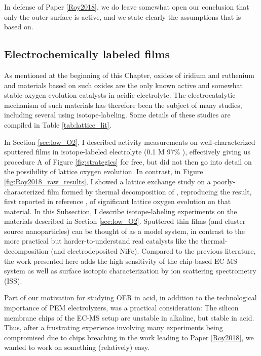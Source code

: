 In defense of Paper \ref{Roy2018}, we do leave somewhat open our conclusion that only the outer surface is active, and we state clearly the assumptions that is based on. 

\subsection{Electrochemically labeled  films} \label{subsec:Ru_exchange}

As mentioned at the beginning of this Chapter, oxides of iridium and ruthenium and materials based on such oxides are the only known active and somewhat stable oxygen evolution catalysts in acidic electrolyte\cite{Reier2017, Kibsgaard2019}. The electrocatalytic mechanism of such materials has therefore been the subject of many studies, including several using isotope-labeling\cite{Wohlfahrt-Mehrens1987, Fierro2007, Macounova2009, Stoerzinger2017, Grimaud2017}. Some details of these studies are compiled in Table \ref{tab:lattice_lit}.

In Section \ref{sec:low_O2}, I described activity measurements on well-characterized sputtered  films in isotope-labeled electrolyte (0.1 M 97\% ), effectively giving us procedure A of Figure \ref{fig:strategies} for free, but did not then go into detail on the possibility of lattice oxygen evolution. In contrast, in Figure \ref{fig:Roy2018_raw_results}, I showed a lattice exchange study on a poorly-characterized  film formed by thermal decomposition of , reproducing the result, first reported in reference , of significant lattice oxygen evolution on that material. In this Subsection, I describe isotope-labeling experiments on the  materials described in Section \ref{sec:low_O2}. Sputtered thin films (and cluster source nanoparticles) can be thought of as a model system, in contrast to the more practical but harder-to-understand real catalysts like the thermal-decomposition  (and electrodeposited NiFe). Compared to the previous literature, the work presented here adds the high sensitivity of the chip-based EC-MS system as well as surface isotopic characterization by ion scattering spectrometry (ISS).

Part of our motivation for studying OER in acid, in addition to the technological importance of PEM electrolyzers, was a practical consideration: The silicon membrane chips of the EC-MS setup are unstable in alkaline, but stable in acid. Thus, after a frustrating experience involving many experiments being compromised due to chips breaching in the work leading to Paper \ref{Roy2018}, we wanted to work on something (relatively) easy.

